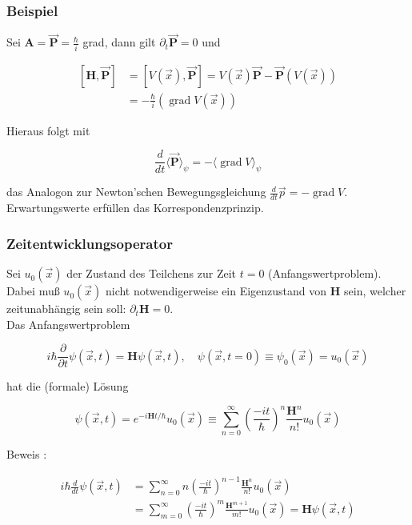\documentclass[10pt, letterpaper]{article}
\begin{document}
\subsubsection*{Beispiel}
Sei $\mathbf{A}=\overrightarrow{\mathbf{P}}=\frac{\hbar}{i}$ grad, dann gilt $\partial_{t} \overrightarrow{\mathbf{P}}=0$ und

$$
\begin{aligned}
{[\mathbf{H}, \overrightarrow{\mathbf{P}}] } & =[V(\vec{x}), \overrightarrow{\mathbf{P}}]=V(\vec{x}) \overrightarrow{\mathbf{P}}-\overrightarrow{\mathbf{P}}(V(\vec{x})) \\
& =-\frac{\hbar}{i}(\operatorname{grad} V(\vec{x}))
\end{aligned}
$$

Hieraus folgt mit

$$
\frac{d}{d t}\langle\overrightarrow{\mathbf{P}}\rangle_{\psi}=-\langle\operatorname{grad} V\rangle_{\psi}
$$

das Analogon zur Newton'schen Bewegungsgleichung $\frac{d}{d t} \vec{p}=-\operatorname{grad} V$.\\
Erwartungswerte erfüllen das Korrespondenzprinzip.

\subsubsection*{Zeitentwicklungsoperator}
Sei $u_{0}(\vec{x})$ der Zustand des Teilchens zur Zeit $t=0$ (Anfangswertproblem). Dabei muß $u_{0}(\vec{x})$ nicht notwendigerweise ein Eigenzustand von $\mathbf{H}$ sein, welcher zeitunabhängig sein soll: $\partial_{t} \mathbf{H}=0$.\\
Das Anfangswertproblem

$$
i \hbar \frac{\partial}{\partial t} \psi(\vec{x}, t)=\mathbf{H} \psi(\vec{x}, t), \quad \psi(\vec{x}, t=0) \equiv \psi_{0}(\vec{x})=u_{0}(\vec{x})
$$

hat die (formale) Lösung

$$
\psi(\vec{x}, t)=e^{-i \mathbf{H} t / \hbar} u_{0}(\vec{x}) \equiv \sum_{n=0}^{\infty}\left(\frac{-i t}{\hbar}\right)^{n} \frac{\mathbf{H}^{n}}{n!} u_{0}(\vec{x})
$$

Beweis :

$$
\begin{aligned}
i \hbar \frac{d}{d t} \psi(\vec{x}, t) & =\sum_{n=0}^{\infty} n\left(\frac{-i t}{\hbar}\right)^{n-1} \frac{\mathbf{H}^{n}}{n!} u_{0}(\vec{x}) \\
& =\sum_{m=0}^{\infty}\left(\frac{-i t}{\hbar}\right)^{m} \frac{\mathbf{H}^{m+1}}{m!} u_{0}(\vec{x})=\mathbf{H} \psi(\vec{x}, t)
\end{aligned}
$$
\end{document}
